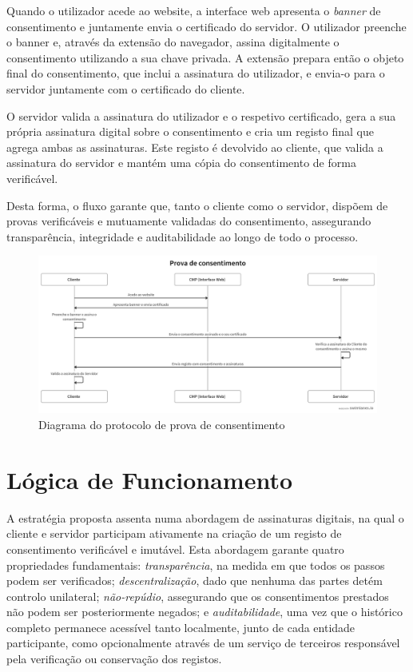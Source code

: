 Quando o utilizador acede ao website, a interface web apresenta o \textit{banner} de consentimento e juntamente envia o certificado do servidor. O utilizador preenche o banner e, através da extensão do navegador, assina digitalmente o consentimento utilizando a sua chave privada. A extensão prepara então o objeto final do consentimento, que inclui a assinatura do utilizador, e envia-o para o servidor juntamente com o certificado do cliente.

O servidor valida a assinatura do utilizador e o respetivo certificado, gera a sua própria assinatura digital sobre o consentimento e cria um registo final que agrega ambas as assinaturas. Este registo é devolvido ao cliente, que valida a assinatura do servidor e mantém uma cópia do consentimento de forma verificável.

Desta forma, o fluxo garante que, tanto o cliente como o servidor, dispõem de provas verificáveis e mutuamente validadas do consentimento, assegurando transparência, integridade e auditabilidade ao longo de todo o processo.

\label{fig:swimlane1}
\begin{figure}[h]
\begin{center}
\includegraphics[width=1\textwidth]{images/swimlanes.png}
\end{center}
\caption{Diagrama do protocolo de prova de consentimento}
\end{figure}

\newpage

\section{Lógica de Funcionamento}

A estratégia proposta assenta numa abordagem de assinaturas digitais, na qual o cliente e servidor participam ativamente na criação de um registo de consentimento verificável e imutável. Esta abordagem garante quatro propriedades fundamentais: \textit{transparência}, na medida em que todos os passos podem ser verificados; \textit{descentralização}, dado que nenhuma das partes detém controlo unilateral; \textit{não-repúdio}, assegurando que os consentimentos prestados não podem ser posteriormente negados; e \textit{auditabilidade}, uma vez que o histórico completo permanece acessível tanto localmente, junto de cada entidade participante, como opcionalmente através de um serviço de terceiros responsável pela verificação ou conservação dos registos.

